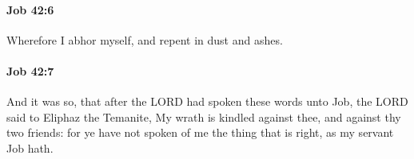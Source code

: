		\paragraph{Job 42:6} %
			\label{JOB-42-6}

			Wherefore I abhor myself, and repent in dust and ashes.


		\paragraph{Job 42:7} %
			\label{JOB-42-7}

			And it was so, that after the LORD had spoken these words unto Job, the LORD said to Eliphaz the Temanite, My wrath is kindled against thee, and against thy two friends: for ye have not spoken of me the thing that is right, as my servant Job hath.


